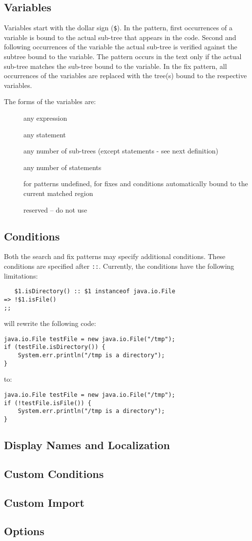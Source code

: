 \documentclass{article}
\begin{document}
\subsection{Variables}

Variables start with the dollar sign (\verb=$=). In the pattern, first occurrences
of a variable is bound to the actual sub-tree that appears in the code. Second and
following occurrences of the variable the actual sub-tree is verified against the subtree
bound to the variable. The pattern occurs in the text only if the actual sub-tree
matches the sub-tree bound to the variable. In the fix pattern, all occurrences of
the variables are replaced with the tree(s) bound to the respective variables.

The forms of the variables are:
\begin{description}
\item[\simplevariable]{any expression}
\item[\statementvariable]{any statement}
\item[\multipletreevariable]{any number of sub-trees (except statements - see next definition)}
\item[\multiplestatementvariable]{any number of statements}
\item[\wholepattern]{for patterns undefined, for fixes and conditions automatically bound to the current matched region}
\item[\reserved]{reserved -- do not use}
\end{description}

\subsection{Conditions}

Both the search and fix patterns may specify additional conditions. These conditions
are specified after \verb=::=. Currently, the conditions have the following
limitations:

\begin{verbatim}
   $1.isDirectory() :: $1 instanceof java.io.File
=> !$1.isFile()
;;
\end{verbatim}

will rewrite the following code:
\begin{verbatim}
java.io.File testFile = new java.io.File("/tmp");
if (testFile.isDirectory()) {
    System.err.println("/tmp is a directory");
}
\end{verbatim}
to:
\begin{verbatim}
java.io.File testFile = new java.io.File("/tmp");
if (!testFile.isFile()) {
    System.err.println("/tmp is a directory");
}
\end{verbatim}

\subsection{Display Names and Localization}

\subsection{Custom Conditions}

\subsection{Custom Import}

\subsection{Options}
\end{document}
